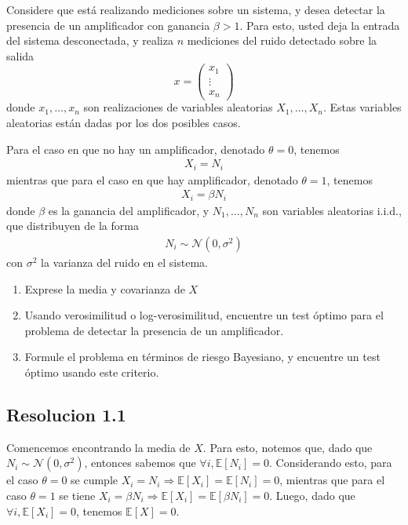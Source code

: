 \documentclass[
  11pt,
  letterpaper,
   addpoints,
   answers
  ]{exam}
\begin{document}
\begin{questions}
    \question Considere que está realizando mediciones sobre un sistema, y desea detectar la presencia de un amplificador con ganancia \(\beta > 1\). Para esto, usted deja la entrada del sistema desconectada, y realiza \(n\) mediciones del ruido detectado sobre la salida
    \[
    x = \begin{pmatrix} x_1 \\ \vdots \\ x_n \end{pmatrix}
    \]
    donde \(x_1, \dots, x_n\) son realizaciones de variables aleatorias \(X_1, \dots, X_n\). Estas variables aleatorias están dadas por los dos posibles casos.
    
    Para el caso en que no hay un amplificador, denotado \(\theta = 0\), tenemos
    \begin{align}
    X_i = N_i
    \end{align}
    mientras que para el caso en que hay amplificador, denotado \(\theta = 1\), tenemos
    \begin{align}
    X_i = \beta N_i
    \end{align}
    donde \(\beta\) es la ganancia del amplificador, y \(N_1, \dots, N_n\) son variables aleatorias i.i.d., que distribuyen de la forma
    \begin{align}
    N_i \sim \mathcal{N}(0, \sigma^2)
    \end{align}
    con \(\sigma^2\) la varianza del ruido en el sistema.
    \begin{enumerate}
        \item Exprese la media y covarianza de \(X\)
        \item Usando verosimilitud o log-verosimilitud, encuentre un test óptimo para el problema de detectar la presencia de un amplificador.
        \item Formule el problema en términos de riesgo Bayesiano, y encuentre un test óptimo usando este criterio.
    \end{enumerate}    
    \begin{solution}
        \subsection*{Resolucion 1.1}
        Comencemos encontrando la media de \( X \). Para esto, notemos que, dado que \( N_i \sim \mathcal{N}(0, \sigma^2) \), entonces sabemos que \(\forall i, \mathbb{E}[N_i] = 0\). Considerando esto, para el caso \(\theta = 0\) se cumple \( X_i = N_i \Rightarrow \mathbb{E}[X_i] = \mathbb{E}[N_i] = 0 \), mientras que para el caso \(\theta = 1\) se tiene \( X_i = \beta N_i \Rightarrow \mathbb{E}[X_i] = \mathbb{E}[\beta N_i] = 0 \). Luego, dado que \(\forall i, \mathbb{E}[X_i] = 0\), tenemos \(\mathbb{E}[X] = 0\).


\end{solution}
\end{questions}
\end{document}
